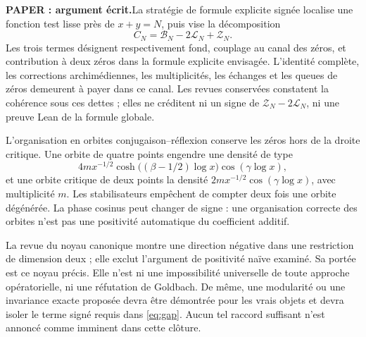 \documentclass[11pt,a4paper]{article}
\theoremstyle{remark}
\newcommand{\paper}{\textbf{PAPER : argument écrit.}\space}
\begin{document}
\paper La stratégie de formule explicite signée localise une fonction
test lisse près de $x+y=N$, puis vise la décomposition
\[
C_N=\mathcal B_N-2\mathcal L_N+\mathcal Z_N.
\]
Les trois termes désignent respectivement fond, couplage au canal des
zéros, et contribution à deux zéros dans la formule explicite envisagée.
L'identité complète, les corrections archimédiennes, les multiplicités,
les échanges et les queues de zéros demeurent à payer dans ce canal.
Les revues conservées constatent la cohérence sous ces dettes ; elles
ne créditent ni un signe de $\mathcal Z_N-2\mathcal L_N$, ni une preuve
Lean de la formule globale.

L'organisation en orbites conjugaison--réflexion conserve les zéros hors
de la droite critique. Une orbite de quatre points engendre une densité
de type
\[
4m x^{-1/2}\cosh\bigl((\beta-1/2)\log x\bigr)
\cos(\gamma\log x),
\]
et une orbite critique de deux points la densité
$2m x^{-1/2}\cos(\gamma\log x)$, avec multiplicité $m$.
Les stabilisateurs empêchent de compter deux fois une orbite dégénérée.
La phase cosinus peut changer de signe : une organisation correcte des
orbites n'est pas une positivité automatique du coefficient additif.

La revue du noyau canonique montre une direction négative dans une
restriction de dimension deux ; elle exclut l'argument de positivité
naïve examiné. Sa portée est ce noyau précis. Elle n'est ni une
impossibilité universelle de toute approche opératorielle, ni une
réfutation de Goldbach. De même, une modularité ou une invariance
exacte proposée devra être démontrée pour les vrais objets et devra
isoler le terme signé requis dans \eqref{eq:gap}. Aucun tel raccord
suffisant n'est annoncé comme imminent dans cette clôture.

\clearpage
\end{document}
